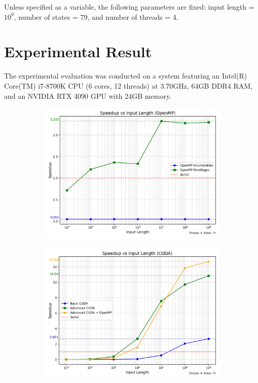 \documentclass[sigconf]{acmart}
\begin{document}
Unless specified as a variable, the following parameters are fixed: input length = $10^9$, number of states = 79, and number of threads = 4.

\section{Experimental Result}

The experimental evaluation was conducted on a system featuring an Intel(R) Core(TM) i7-8700K CPU (6 cores, 12 threads) at 3.70GHz, 64GB DDR4 RAM, and an NVIDIA RTX 4090 GPU with 24GB memory.

\begin{figure}[t]
	\begin{subfigure}{.33\textwidth}
		\centering
		\includegraphics[width=\linewidth]{input_length_omp}
		\caption{}
		\label{fig:SpeedupInputLengthOMP}
	\end{subfigure}
	\begin{subfigure}{.33\textwidth}
		\centering
		\includegraphics[width=\linewidth]{input_length_cuda}

\end{subfigure}
\end{figure}
\end{document}
